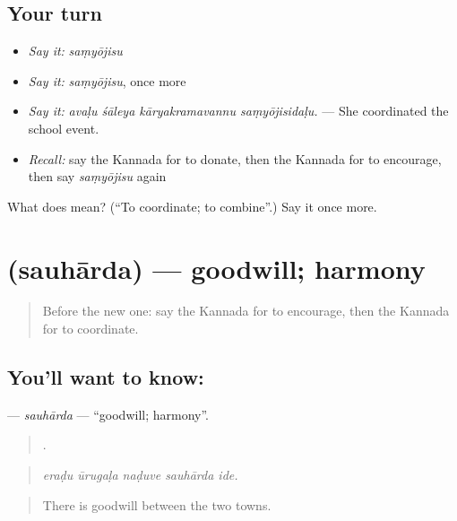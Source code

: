 \subsection*{Your turn}
\begin{itemize}
\raggedright
  \item \emph{Say it:} \emph{saṃyōjisu}
  \item \emph{Say it:} \emph{saṃyōjisu}, once more
  \item \emph{Say it:} \emph{avaḷu śāleya kāryakramavannu saṃyōjisidaḷu.} — She coordinated the school event.
  \item \emph{Recall:} say the Kannada for to donate, then the Kannada for to encourage, then say \emph{saṃyōjisu} again
\end{itemize}

\begin{tcolorbox}[breakable,colback=teal!4,colframe=teal!35!black,title={Before you move on}]
What does  mean? (\textquotedblleft{}To coordinate; to combine\textquotedblright{}.) Say it once more.
\end{tcolorbox}
\section[\texorpdfstring{\kn{ಸೌಹಾರ್ದ} (sauhārda)}{ಸೌಹಾರ್ದ (sauhārda)}]{ (sauhārda) — goodwill; harmony}

\label{lesson:KA-C404-sauharda}



\begin{quote}
Before the new one: say the Kannada for to encourage, then the Kannada for to coordinate.
\end{quote}

\subsection*{You'll want to know: }
\textbf{} — \emph{sauhārda} — \textquotedblleft{}goodwill; harmony\textquotedblright{}.

\begin{quote}
    .
\end{quote}

\begin{quote}
\emph{eraḍu ūrugaḷa naḍuve sauhārda ide.}
\end{quote}

\begin{quote}
There is goodwill between the two towns.
\end{quote}

